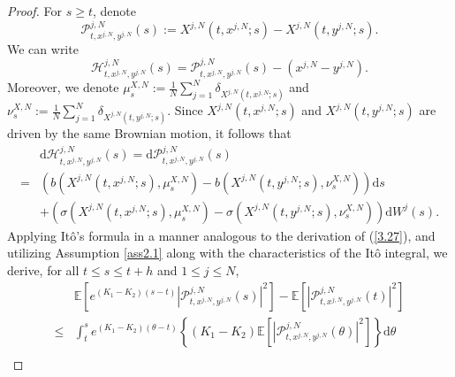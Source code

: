 \documentclass[10pt,a4paper]{amsart}
\begin{document}
\begin{proof}  For $s \geq t$,  denote  \begin{equation}\tag{5.27}\label{4.8}
\mathcal{P}^{j,N}_{t, x^{j,N}, y^{j,N}}\left(s\right):=X^{j,N}\left(t, x^{j,N} ; s\right)-X^{j,N}\left(t,y^{j,N} ; s\right).
\end{equation}
We can write 
\begin{equation}\tag{5.28}\label{4.9}
\mathcal{H}^{j,N}_{t, x^{j,N}, y^{j,N}}\left(s\right)=\mathcal{P}^{j,N}_{t, x^{j,N}, y^{j,N}}\left(s\right)-\left(x^{j,N}-y^{j,N}\right).
\end{equation}
 Moreover, we denote $\mu _{s}^{X,N}:=\tfrac{1}{N}\sum_{j=1}^N{\delta _{X^{j,N}\left(t,x^{j,N};s\right)}}$ and $\nu _{s}^{X,N}:=\tfrac{1}{N}\sum_{j=1}^N{\delta _{X^{j,N}\left(t,y^{j,N};s\right)}}$. Since $X^{j,N}\left(t, x^{j,N} ; s\right)$ and $X^{j,N}\left(t, y^{j,N} ; s\right)$ are driven by the same Brownian motion, it follows that
\begin{equation}\tag{5.29}\label{4.10}
\begin{aligned}
&\mathrm{d} \mathcal{H}^{j,N}_{t, x^{j,N}, y^{j,N}}\left(s\right)=\mathrm{d} \mathcal{P}^{j,N}_{t, x^{j,N}, y^{j,N}}\left(s\right)\\
=&\left(b\left(X^{j,N}\left(t, x^{j,N} ; s\right), \mu _{s}^{X,N}\right)-b\left(X^{j,N}\left(t, y^{j,N} ; s\right), \nu _{s}^{X,N}\right)\right) \mathrm{d} s\\
&+\left(\sigma\left(X^{j,N}\left(t, x^{j,N} ; s\right), \mu _{s}^{X,N}\right)-\sigma\left(X^{j,N}\left(t, y^{j,N} ; s\right), \nu _{s}^{X,N}\right)\right) \mathrm{d} W^{j}\left(s\right).
\end{aligned}
\end{equation}
   Applying It{\^o}'s formula in a manner analogous to the derivation of (\ref{3.27}), and utilizing Assumption \ref{ass2.1} along with the characteristics of the It{\^o} integral, we derive, for all $t \leq s \leq t+h$  and $1\leq j\leq N$,
\begin{equation}\tag{5.30}\label{4.12}
\begin{aligned}
& \mathbb{E}\left[e^{\left(K_1-K_2\right)\left(s-t\right)}\left|\mathcal{P}^{j,N}_{t, x^{j,N}, y^{j,N}}\left(s\right)\right|^{2}\right]-\mathbb{E}\left[\left|\mathcal{P}^{j,N}_{t, x^{j,N}, y^{j,N}}\left(t\right)\right|^{2}\right] \\
\leq & \int_t^s  e^{\left(K_1-K_2\right)\left(\theta-t\right)}\left\{\left(K_1-K_2\right)\mathbb{E}\left[\left|\mathcal{P}^{j,N}_{t, x^{j,N}, y^{j,N}}\left(\theta\right)\right|^{2}\right]\right\}\mathrm{d} \theta\\ 

\end{aligned}
\end{equation}
\end{proof}
\end{document}
